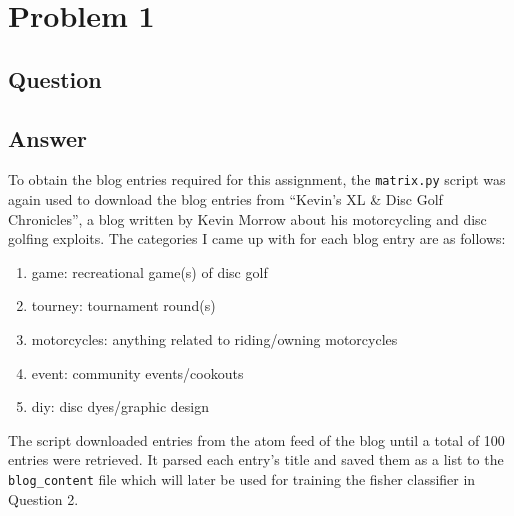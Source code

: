 \section{Problem 1}

\subsection{Question}


\subsection{Answer}

To obtain the blog entries required for this assignment, the {\tt matrix.py} script was again used to download the blog entries from ``Kevin's XL \& Disc Golf Chronicles'', a blog written by Kevin Morrow about his motorcycling and disc golfing exploits. The categories I came up with for each blog entry are as follows:

\begin{enumerate}
	\item game: recreational game(s) of disc golf
	\item tourney: tournament round(s)
	\item motorcycles: anything related to riding/owning motorcycles
	\item event: community events/cookouts
	\item diy: disc dyes/graphic design
\end{enumerate}

\clearpage

The script downloaded entries from the atom feed \cite{atom} of the blog until a total of 100 entries were retrieved. It parsed each entry's title and saved them as a list to the {\tt blog\_content} file which will later be used for training the fisher classifier in Question 2.


